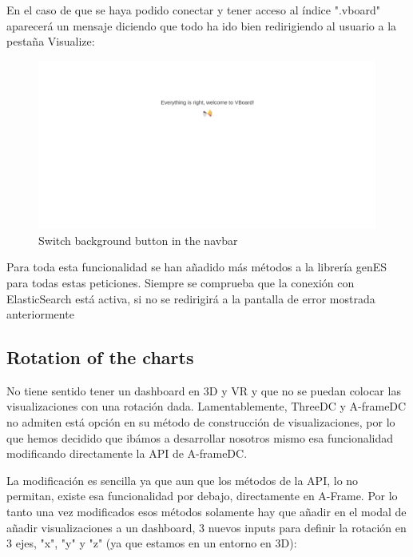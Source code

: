 \documentclass[a4paper, 12pt]{book}
\begin{document}
En el caso de que se haya podido conectar y tener acceso al índice ".vboard" aparecerá un mensaje diciendo que todo ha ido bien redirigiendo al usuario a la pestaña Visualize:

\begin{figure}[H]
  \centering
  \includegraphics[width=16cm, keepaspectratio]{img/development/msgright}
  \caption{Switch background button in the navbar}
  \label{fig:examplestandalone}
\end{figure}

Para toda esta funcionalidad se han añadido más métodos a la librería genES para todas estas peticiones. Siempre se comprueba que la conexión con ElasticSearch está activa, si no se redirigirá a la pantalla de error mostrada anteriormente

\subsection{Rotation of the charts}

No tiene sentido tener un dashboard en 3D y VR y que no se puedan colocar las visualizaciones con una rotación dada. Lamentablemente, ThreeDC y A-frameDC no admiten está opción en su método de construcción de visualizaciones, por lo que hemos decidido que ibámos a desarrollar nosotros mismo esa funcionalidad modificando directamente la API de A-frameDC.

La modificación es sencilla ya que aun que los métodos de la API, lo no permitan, existe esa funcionalidad por debajo, directamente en A-Frame. Por lo tanto una vez modificados esos métodos solamente hay que añadir en el modal de añadir visualizaciones a un dashboard, 3 nuevos inputs para definir la rotación en 3 ejes, "x", "y" y "z" (ya que estamos en un entorno en 3D):
\end{document}
